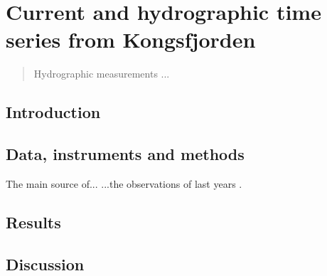 
\renewcommand{\chapterauthor}{John Doe}
\chapter{Current and hydrographic time series from Kongsfjorden}
\label{student1:report}

\begin{abstract}
\noindent Hydrographic measurements ...

\end{abstract}

\section{Introduction}


\section{Data, instruments and methods}

The main source of...
...the observations of last years \citep{AGF2012,AGF2011,cottier}.\par




\section{Results}



\section{Discussion}
